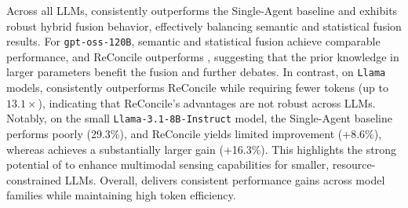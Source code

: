 Across all LLMs, \system{} consistently outperforms the Single-Agent baseline and exhibits robust hybrid fusion behavior, effectively balancing semantic and statistical fusion results. For \texttt{gpt-oss-120B}, semantic and statistical fusion achieve comparable performance, and ReConcile outperforms \system{}, suggesting that the prior knowledge in larger parameters benefit the fusion and further debates. In contrast, on \texttt{Llama} models, \system{} consistently outperforms ReConcile while requiring fewer tokens (up to $13.1\times$), indicating that ReConcile's advantages are not robust across LLMs. Notably, on the small \texttt{Llama-3.1-8B-Instruct} model, the Single-Agent baseline performs poorly (29.3\%), and ReConcile yields limited improvement (+8.6\%), whereas \system{} achieves a substantially larger gain (+16.3\%). This highlights the strong potential of \system{} to enhance multimodal sensing capabilities for smaller, resource-constrained LLMs. Overall, \system{} delivers consistent performance gains across model families while maintaining high token efficiency.



